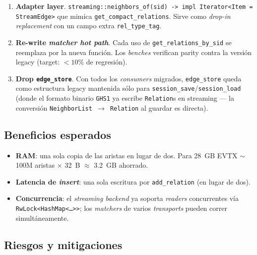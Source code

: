 \begin{enumerate}
    \item \textbf{Adapter layer}. \texttt{streaming::neighbors\_of(sid) ->
    impl Iterator<Item = StreamEdge>} que mimica
    \texttt{get\_compact\_relations}. Sirve como \emph{drop-in
    replacement} con un campo extra \texttt{rel\_type\_tag}.
    \item \textbf{Re-write \emph{matcher hot path}}. Cada uso de
    \texttt{get\_relations\_by\_sid} se reemplaza por la nueva
    función. Los \emph{benches} verifican parity contra la versión
    legacy (target: \(< 10\%\) de regresión).
    \item \textbf{Drop \texttt{edge\_store}}. Con todos los
    \emph{consumers} migrados, \texttt{edge\_store} queda como
    estructura legacy mantenida sólo para
    \texttt{session\_save}/\texttt{session\_load} (donde el formato
    binario \texttt{GHS1} ya escribe \texttt{Relation}s en streaming
    --- la conversión \texttt{NeighborList \(\rightarrow\) Relation}
    al guardar es directa).
\end{enumerate}

\subsection{Beneficios esperados}

\begin{itemize}
    \item \textbf{RAM}: una sola copia de las aristas en lugar de dos.
    Para 28~GB EVTX \(\sim\) 100M aristas \(\times\) 32~B \(\approx\)
    3.2~GB ahorrado.
    \item \textbf{Latencia de \emph{insert}}: una sola escritura por
    \texttt{add\_relation} (en lugar de dos).
    \item \textbf{Concurrencia}: el \emph{streaming backend} ya
    soporta \emph{readers} concurrentes vía
    \texttt{RwLock<HashMap<\ldots>>}; los \emph{matchers} de varios
    \emph{transports} pueden correr simultáneamente.
\end{itemize}

\subsection{Riesgos y mitigaciones}

